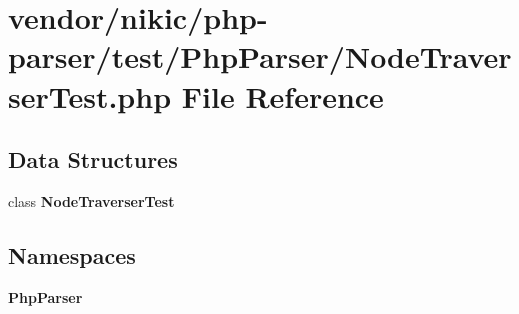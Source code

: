 \section{vendor/nikic/php-\/parser/test/\+Php\+Parser/\+Node\+Traverser\+Test.php File Reference}
\label{_node_traverser_test_8php}
\subsection*{Data Structures}
\begin{DoxyCompactItemize}
\item 
class {\bf Node\+Traverser\+Test}
\end{DoxyCompactItemize}
\subsection*{Namespaces}
\begin{DoxyCompactItemize}
\item 
 {\bf Php\+Parser}
\end{DoxyCompactItemize}

